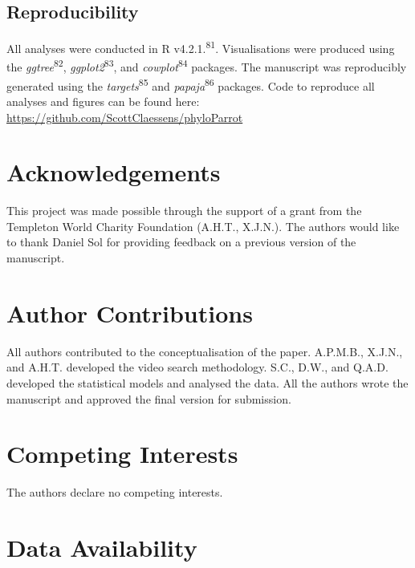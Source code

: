 \documentclass[
  man, donotrepeattitle,floatsintext]{apa6}
\begin{document}
\hypertarget{reproducibility}{%
\subsection{Reproducibility}\label{reproducibility}}

All analyses were conducted in R v4.2.1.\textsuperscript{81}. Visualisations were
produced using the \emph{ggtree}\textsuperscript{82}, \emph{ggplot2}\textsuperscript{83}, and \emph{cowplot}\textsuperscript{84} packages. The manuscript was reproducibly generated using the
\emph{targets}\textsuperscript{85} and \emph{papaja}\textsuperscript{86} packages. Code to reproduce all
analyses and figures can be found here:
\url{https://github.com/ScottClaessens/phyloParrot}

\newpage
\nolinenumbers

\hypertarget{acknowledgements}{%
\section{Acknowledgements}\label{acknowledgements}}

This project was made possible through the support of a grant from the Templeton
World Charity Foundation (A.H.T., X.J.N.). The authors would like to thank
Daniel Sol for providing feedback on a previous version of the manuscript.

\hypertarget{author-contributions}{%
\section{Author Contributions}\label{author-contributions}}

All authors contributed to the conceptualisation of the paper. A.P.M.B., X.J.N.,
and A.H.T. developed the video search methodology. S.C., D.W., and Q.A.D.
developed the statistical models and analysed the data. All the authors wrote
the manuscript and approved the final version for submission.

\hypertarget{competing-interests}{%
\section{Competing Interests}\label{competing-interests}}

The authors declare no competing interests.

\hypertarget{data-availability}{%
\section{Data Availability}\label{data-availability}}
\end{document}
